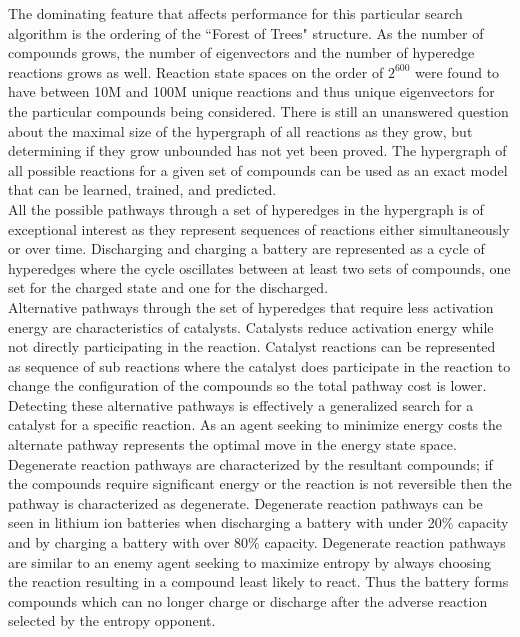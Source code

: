 \documentclass{article}
\begin{document}
The dominating feature that affects performance for this particular search algorithm is the ordering of the ``Forest of Trees" structure.  As the number of compounds grows, the number of eigenvectors and the number of hyperedge reactions grows as well. Reaction state spaces on the order of $2^{600}$ were found to have between 10M and 100M unique reactions and thus unique eigenvectors for the particular compounds being considered. There is still an unanswered question about the maximal size of the hypergraph of all reactions as they grow, but determining if they grow unbounded has not yet been proved. The hypergraph of all possible reactions for a given set of compounds can be used as an exact model that can be learned, trained, and predicted. \\

All the possible pathways through a set of hyperedges in the hypergraph is of exceptional interest as they represent sequences of reactions either simultaneously or over time. Discharging and charging a battery are represented as a cycle of hyperedges where the cycle oscillates between at least two sets of compounds, one set for the charged state and one for the discharged. \\

Alternative pathways through the set of hyperedges that require less activation energy are characteristics of catalysts. Catalysts reduce activation energy while not directly participating in the reaction. Catalyst reactions can be represented as sequence of sub reactions where the catalyst does participate in the reaction to change the configuration of the compounds so the total pathway cost is lower. Detecting these alternative pathways is effectively a generalized search for a catalyst for a specific reaction. As an agent seeking to minimize energy costs the alternate pathway represents the optimal move in the energy state space.\\

Degenerate reaction pathways are characterized by the resultant compounds; if the compounds require significant energy or the reaction is not reversible then the pathway is characterized as degenerate. Degenerate reaction pathways can be seen in lithium ion batteries when discharging a battery with under 20\% capacity and by charging a battery with over 80\% capacity. Degenerate reaction pathways are similar to an enemy agent seeking to maximize entropy by always choosing the reaction resulting in a compound least likely to react. Thus the battery forms compounds which can no longer charge or discharge after the adverse reaction selected by the entropy opponent. \\
\newpage
\end{document}
